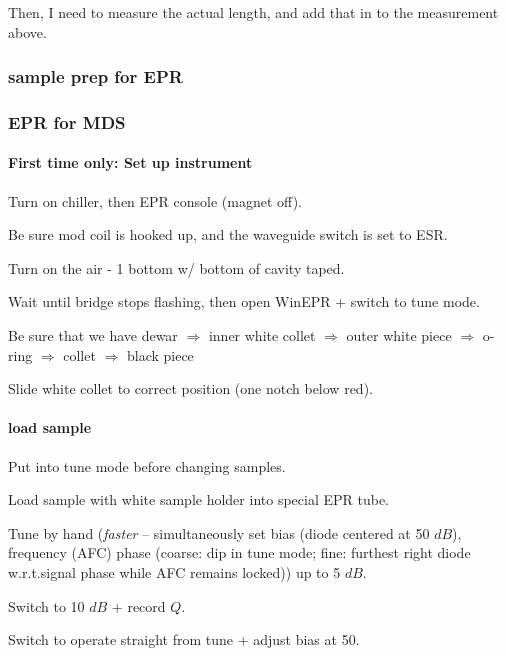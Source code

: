 {Then, I need to measure the actual length, and add that in to the measurement above.


}
\subsubsection{sample prep for EPR}

\subsubsection{EPR for MDS}
\paragraph{First time only: Set up instrument}
Turn on chiller, then EPR console (magnet off).

Be sure  mod coil is hooked up, and the waveguide switch is set to ESR.

Turn on the air - 1 bottom w/ bottom of cavity taped.

Wait until bridge stops flashing, then open WinEPR + switch to tune mode.

Be sure that we have dewar $\Rightarrow$ inner white collet $\Rightarrow$ outer white piece $\Rightarrow$ o-ring $\Rightarrow$ collet $\Rightarrow$ black piece


Slide white collet to correct position (one notch below red).

\paragraph{load sample}
Put into tune mode before changing samples.

Load sample with white sample holder into special EPR tube.

 { Tune by hand ({\it faster} -- simultaneously set bias (diode centered at 50 $dB$), frequency (AFC) phase (coarse: dip in tune mode; fine: furthest right diode w.r.t.signal phase while AFC remains locked)) up to 5 $dB$.}

Switch to 10 $dB$ + record $Q$.

Switch to operate straight from tune + adjust bias at 50.

